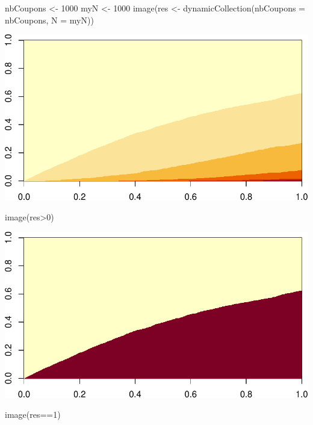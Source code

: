 \documentclass[
]{article}
\newenvironment{Shaded}{\begin{snugshade}}{\end{snugshade}}
\newcommand{\AttributeTok}[1]{\textcolor[rgb]{0.77,0.63,0.00}{#1}}
\newcommand{\DecValTok}[1]{\textcolor[rgb]{0.00,0.00,0.81}{#1}}
\newcommand{\FunctionTok}[1]{\textcolor[rgb]{0.00,0.00,0.00}{#1}}
\newcommand{\NormalTok}[1]{#1}
\newcommand{\OtherTok}[1]{\textcolor[rgb]{0.56,0.35,0.01}{#1}}
\newcommand{\SpecialCharTok}[1]{\textcolor[rgb]{0.00,0.00,0.00}{#1}}
\begin{document}
\begin{Shaded}
\begin{Highlighting}[]
\NormalTok{nbCoupons }\OtherTok{\textless{}{-}} \DecValTok{1000}
\NormalTok{myN }\OtherTok{\textless{}{-}} \DecValTok{1000}
\FunctionTok{image}\NormalTok{(res }\OtherTok{\textless{}{-}} \FunctionTok{dynamicCollection}\NormalTok{(}\AttributeTok{nbCoupons =}\NormalTok{ nbCoupons, }\AttributeTok{N =}\NormalTok{ myN))}
\end{Highlighting}
\end{Shaded}

\includegraphics{examples_files/figure-latex/unnamed-chunk-5-1.pdf}

\begin{Shaded}
\begin{Highlighting}[]
\FunctionTok{image}\NormalTok{(res}\SpecialCharTok{\textgreater{}}\DecValTok{0}\NormalTok{)}
\end{Highlighting}
\end{Shaded}

\includegraphics{examples_files/figure-latex/unnamed-chunk-5-2.pdf}

\begin{Shaded}
\begin{Highlighting}[]
\FunctionTok{image}\NormalTok{(res}\SpecialCharTok{==}\DecValTok{1}\NormalTok{)}
\end{Highlighting}
\end{Shaded}
\end{document}
